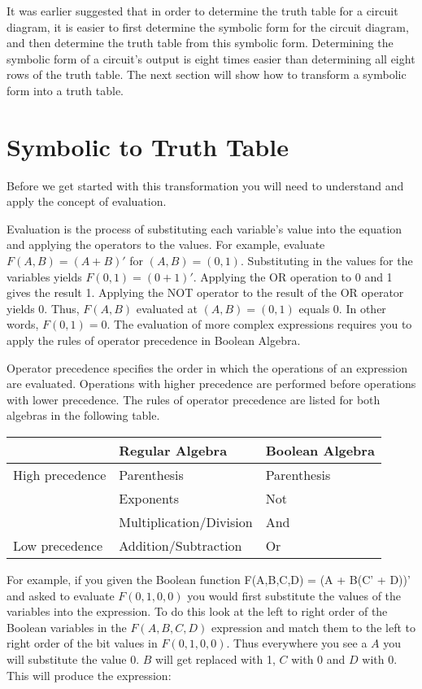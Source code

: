 It was earlier suggested that in order to determine the truth table for a
circuit diagram, it is easier to first determine the symbolic form for
the circuit diagram, and then determine the truth table from this symbolic 
form.  Determining the symbolic form of a circuit's output is eight times
easier than determining all eight rows of the truth table.
The next section will show how to transform a symbolic 
form into a truth table.

\section{Symbolic to Truth Table}

Before we get started with this transformation you will need 
to understand and apply the concept of evaluation.

Evaluation is the process
of substituting each variable's value into the equation and applying 
the operators to the values.  For example, evaluate $F(A,B) = (A+B)'$
for $(A,B) = (0,1)$.  Substituting in the values for the variables
yields $F(0,1) = (0+1)'$.  Applying the OR operation to 0 and 1 gives the 
result 1.  Applying the NOT operator to the result of the OR operator yields 0.
Thus, $F(A,B)$ evaluated at $(A,B)=(0,1)$ equals 0.  In other words,
$F(0,1)=0$.  The evaluation of more complex expressions requires 
you to apply the rules of operator precedence in Boolean Algebra.

Operator precedence specifies the order in which the
operations of an expression are evaluated.  Operations with higher precedence
are performed before operations with lower precedence.  The rules of operator 
precedence are listed for both algebras in the following table.

\begin{tabular}[ht]{l|l|l}
			& Regular Algebra			& Boolean Algebra \\ \hline \hline
High precedence	& Parenthesis			& Parenthesis	\\ \hline
			& Exponents				& Not			\\ \hline
			& Multiplication/Division	& And			\\ \hline
Low precedence	& Addition/Subtraction 		& Or 			\\
\end{tabular}

For example, if you given the Boolean function F(A,B,C,D) = (A + B(C' + D))'
and asked to evaluate $F(0,1,0,0)$ you would first substitute the values of
the variables into the expression. To do this look at the left to right order 
of the Boolean variables in the $F(A,B,C,D)$ expression and match them to the 
left to right order of the bit values in $F(0,1,0,0)$.  Thus everywhere you see a
$A$ you will substitute the value 0.  $B$ will get replaced with 1, $C$ with 0
and $D$ with 0.  This will produce the expression:

